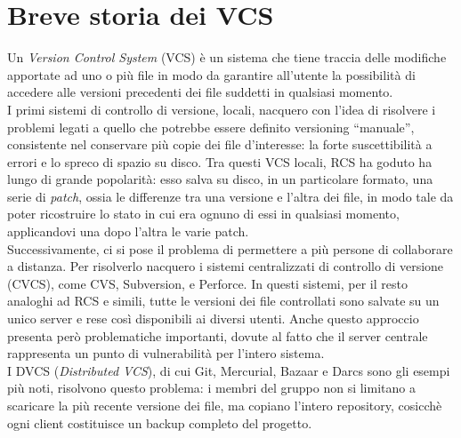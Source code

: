 \documentclass[12pt]{article}
\def\quote#1{``#1''}
\begin{document}
\section{Breve storia dei VCS}
Un \textit{Version Control System} (VCS) è un sistema che tiene traccia delle modifiche apportate ad uno o più file in modo da garantire all'utente la possibilità di accedere alle versioni precedenti dei file suddetti in qualsiasi momento. 
\bigskip \\
I primi sistemi di controllo di versione, locali, nacquero con l'idea di risolvere i problemi legati a quello che potrebbe essere definito versioning \quote{manuale}, consistente nel conservare più copie dei file d'interesse: la forte suscettibilità a errori e lo spreco di spazio su disco. Tra questi VCS locali, RCS ha goduto ha lungo di grande popolarità: esso salva su disco, in un particolare formato, una serie di \textit{patch}, ossia le differenze tra una versione e l'altra dei file, in modo tale da poter ricostruire lo stato in cui era ognuno di essi in qualsiasi momento, applicandovi una dopo l'altra le varie patch.
\bigskip \\
Successivamente, ci si pose il problema di permettere a più persone di collaborare a distanza. Per risolverlo nacquero i sistemi centralizzati di controllo di versione (CVCS), come CVS, Subversion, e Perforce. In questi sistemi, per il resto analoghi ad RCS e simili, tutte le versioni dei file controllati sono salvate su un unico server e rese così disponibili ai diversi utenti. Anche questo approccio presenta però problematiche importanti, dovute al fatto che il server centrale rappresenta un punto di vulnerabilità per l'intero sistema. 
\bigskip \\
I DVCS (\textit{Distributed VCS}), di cui Git, Mercurial, Bazaar e Darcs sono gli esempi più noti, risolvono questo problema: i membri del gruppo non si limitano a scaricare la più recente versione dei file, ma copiano l'intero repository, cosicchè ogni client costituisce un backup completo del progetto.
\end{document}

